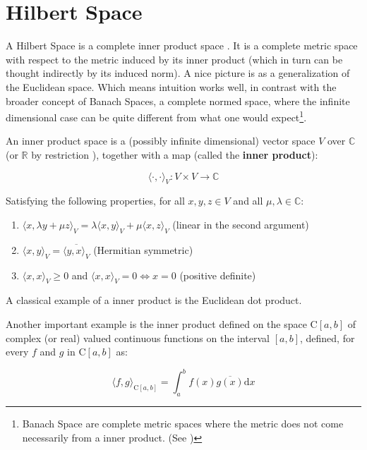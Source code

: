 
\section{Hilbert Space}
\label{s:hilbert}
A Hilbert Space is a complete inner product space \cite{HS-YN:11}. It is a
complete metric space with respect to the metric induced by its inner product
(which in turn can be thought indirectly by its induced norm). A nice picture
is as a generalization of the Euclidean space. Which means intuition works well,
in contrast with the broader concept of Banach Spaces, a complete normed space,
where the infinite dimensional case can be quite different from what one would
expect\footnote{Banach Space are complete metric spaces where the metric does
not come necessarily from a inner product. (See \citet{HS-HJNB:00})}.

An inner product space\cite{HS-HJNB:00} is a (possibly infinite dimensional)
vector space $V$ over $\mathbb{C}$ (or $\mathbb{R}$ by restriction ), together
with a map (called the \textbf{inner product}):

\[  \langle\cdot,\cdot\rangle_{\scriptscriptstyle V}: V \times V \to \mathbb{C}
\]

Satisfying the following properties, for all $x,y,z \in V$ and all $\mu, \lambda
\in \mathbb{C}$:

\begin{enumerate}[I]
  \item \(  \langle x,\lambda y + \mu z  \rangle_{\scriptscriptstyle V} = \lambda\langle	
  x,y\rangle_ {\scriptscriptstyle V} + \mu \langle x,z \rangle_{\scriptscriptstyle V} \) (linear in the second argument)
  \item \( \langle x,y \rangle_{\scriptscriptstyle V} = \overline{\langle y,x \rangle_{\scriptscriptstyle V} } \)
  (Hermitian symmetric)
  \item  \( \langle x,x \rangle_{\scriptscriptstyle V} \geq 0 \) and \( \langle x,x \rangle_{\scriptscriptstyle V} = 0
  \Leftrightarrow x = 0 \) (positive definite)
\end{enumerate}

A classical example of a inner product is the Euclidean dot product.

Another important example is the inner product defined on the space C$[a,b]$ of
complex (or real) valued continuous functions on the interval $[a,b]$, defined,
for every $f$ and $g$ in C$[a,b]$ as:

\begin{equation}\label{eq::func_inner}
  \langle f,g\rangle_{\scriptscriptstyle \text{C}[a,b]} = \int_a^b
  f(x)\overline{g(x)} \mathrm{d}x
\end{equation}

